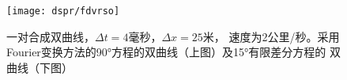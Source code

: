 \begin{figure}[H]
\centering
\texttt{[image: dspr/fdvrso]}
\caption[fdvrso]{一对合成双曲线，$\Delta t=4$毫秒，$\Delta x=25$米，
速度为2公里/秒。采用Fourier变换方法的90°方程的双曲线（上图）及15°有限差分方程的
双曲线（下图）}
\label{fig:dspr/fdvrso}
\end{figure}









